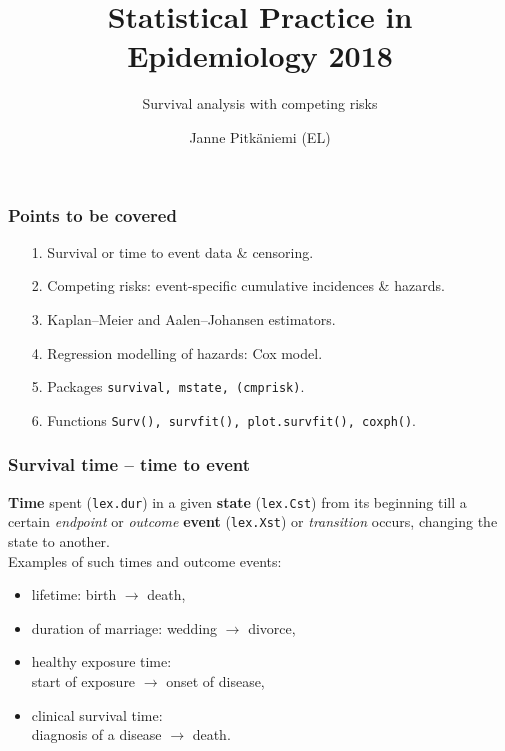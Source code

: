 \documentclass[handout,12pt,dvipsnames,t]{beamer}
\title{Statistical Practice in Epidemiology 2018 \newline }
\subtitle{Survival analysis with competing risks} %
\author{Janne Pitk\"aniemi (EL) }
\date{}
\begin{document}


\maketitle


\begin{frame}[fragile]
\frametitle{Points to be covered}

\begin{itemize}
\item[1.] Survival or time to event data \& censoring.
 \medskip
 \item[2.] 
 Competing risks: event-specific cumulative incidences \& hazards.
 \medskip
\item[3.] Kaplan--Meier and Aalen--Johansen estimators.
 \medskip
 \item[4.] 
 Regression modelling of hazards: Cox model.
 \medskip
 \item[5.]
 Packages \texttt{survival, mstate, (cmprisk)}.
\medskip
\item[6.] 
 Functions \texttt{Surv(), survfit(), plot.survfit(), coxph()}.
\end{itemize}

\end{frame}


\begin{frame}[fragile]
\frametitle{Survival time -- time to event}

\textbf{Time} spent (\texttt{lex.dur}) in a given \textbf{state} (\texttt{lex.Cst}) from its 
beginning till a certain \textit{endpoint} or \textit{outcome} \textbf{event}  (\texttt{lex.Xst}) or \textit{transition}  occurs, changing the state to another. \\
 

\bigskip
Examples of such times and outcome events:
\begin{itemize}
\item lifetime: birth $\rightarrow$ death,
\medskip
\item duration of marriage: wedding $\to$ divorce, 
\medskip
\item healthy exposure time: \\ start of exposure  
  $\rightarrow$ onset of disease,
  \medskip
\item clinical survival time: \\
 diagnosis of a disease  $\rightarrow$ death.
\end{itemize}


\end{frame}
\end{document}
